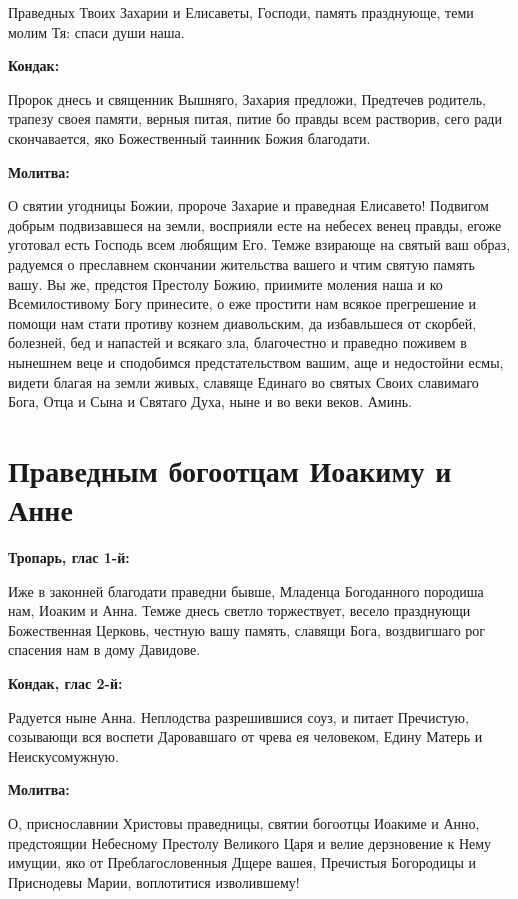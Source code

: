 Праведных Твоих Захарии и Елисаветы, Господи, память празднующе, теми молим Тя: спаси души наша.


\medskip
\bfseries Кондак:\normalfont{}\nopagebreak


Пророк днесь и священник Вышняго, Захария предложи, Предтечев родитель, трапезу своея памяти, верныя питая, питие бо правды всем растворив, сего ради скончавается, яко Божественный таинник Божия благодати.


\medskip
\bfseries Молитва:\normalfont{}\nopagebreak


О святии угодницы Божии, пророче Захарие и праведная Елисавето! Подвигом добрым подвизавшеся на земли, восприяли есте на небесех венец правды, егоже уготовал есть Господь всем любящим Его. Темже взирающе на святый ваш образ, радуемся о преславнем скончании жительства вашего и чтим святую память вашу. Вы же, предстоя Престолу Божию, приимите моления наша и ко Всемилостивому Богу принесите, о еже простити нам всякое прегрешение и помощи нам стати противу кознем диавольским, да избавльшеся от скорбей, болезней, бед и напастей и всякаго зла, благочестно и праведно поживем в нынешнем веце и сподобимся предстательством вашим, аще и недостойни есмы, видети благая на земли живых, славяще Единаго во святых Своих славимаго Бога, Отца и Сына и Святаго Духа, ныне и во веки веков. Аминь.

\newpage\section{Праведным богоотцам Иоакиму и Анне}
 
\bfseries Тропарь, глас 1-й:\normalfont{}


Иже в законней благодати праведни бывше, Младенца Богоданного породиша нам, Иоаким и Анна. Темже днесь светло торжествует, весело празднующи Божественная Церковь, честную вашу память, славящи Бога, воздвигшаго рог спасения нам в дому Давидове.


\medskip
\bfseries Кондак, глас 2-й:\normalfont{}\nopagebreak


Радуется ныне Анна. Неплодства разрешившися соуз, и питает Пречистую, созывающи вся воспети Даровавшаго от чрева ея человеком, Едину Матерь и Неискусомужную.


\medskip
\bfseries Молитва:\normalfont{}\nopagebreak


О, приснославнии Христовы праведницы, святии богоотцы Иоакиме и Анно, предстоящии Небесному Престолу Великого Царя и велие дерзновение к Нему имущии, яко от Преблагословенныя Дщере вашея, Пречистыя Богородицы и Приснодевы Марии, воплотитися изволившему!

